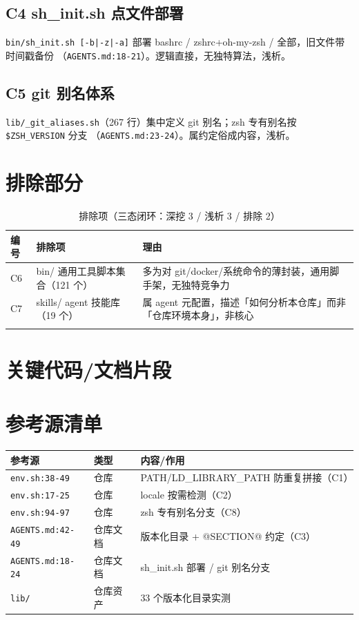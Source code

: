 \documentclass[UTF8]{ctexart}
\begin{document}
\subsection{C4 sh\_init.sh 点文件部署}
\texttt{bin/sh\_init.sh [-b|-z|-a]} 部署 bashrc / zshrc+oh-my-zsh / 全部，旧文件带时间戳备份
（\texttt{\nolinkurl{AGENTS.md:18-21}}）。逻辑直接，无独特算法，浅析。

\subsection{C5 git 别名体系}
\texttt{lib/\_git\_aliases.sh}（267 行）集中定义 git 别名；zsh 专有别名按 \texttt{\$ZSH\_VERSION} 分支
（\texttt{\nolinkurl{AGENTS.md:23-24}}）。属约定俗成内容，浅析。

\section{排除部分}
\begin{xltabular}{\textwidth}{llX}
\toprule
\textcolor{warn}{编号} & 排除项 & \textcolor{warn}{理由} \\
\midrule
\endhead
C6 & bin/ 通用工具脚本集合（121 个） & 多为对 git/docker/系统命令的薄封装，通用脚手架，无独特竞争力 \\
C7 & skills/ agent 技能库（19 个） & 属 agent 元配置，描述「如何分析本仓库」而非「仓库环境本身」，非核心 \\
\bottomrule
\caption{排除项（三态闭环：深挖 3 / 浅析 3 / 排除 2）}
\end{xltabular}

\section{关键代码/文档片段}



\section{参考源清单}
\begin{xltabular}{\textwidth}{llX}
\toprule
\textcolor{evidence}{参考源} & 类型 & 内容/作用 \\
\midrule
\endhead
\texttt{\nolinkurl{env.sh:38-49}} & 仓库 & PATH/LD\_LIBRARY\_PATH 防重复拼接（C1） \\
\texttt{\nolinkurl{env.sh:17-25}} & 仓库 & locale 按需检测（C2） \\
\texttt{\nolinkurl{env.sh:94-97}} & 仓库 & zsh 专有别名分支（C8） \\
\texttt{\nolinkurl{AGENTS.md:42-49}} & 仓库文档 & 版本化目录 + @SECTION@ 约定（C3） \\
\texttt{\nolinkurl{AGENTS.md:18-24}} & 仓库文档 & sh\_init.sh 部署 / git 别名分支 \\
\texttt{\nolinkurl{lib/}} & 仓库资产 & 33 个版本化目录实测 \\
\bottomrule
\end{xltabular}
\end{document}
